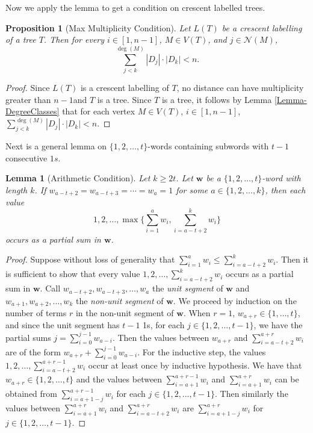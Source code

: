\documentclass[12]{article}
\newtheorem{lem}{Lemma} %
\newtheorem{prop}[thm]{Proposition}
\theoremstyle{definition}
\begin{document}
	Now we apply the lemma to get a condition on crescent labelled trees.
	
	\begin{prop}[Max Multiplicity Condition]
		Let $L(T)$ be a crescent labelling of a tree $T$.  Then for every $i \in [1,n-1]$, $M \in V(T)$, and $j \in \mathcal{N}(M)$, 
		$$\sum_{j < k}^{\deg(M)} |D_j|\cdot |D_k| < n.$$
	\end{prop}
	
	\begin{proof}
		Since $L(T)$ is a crescent labelling of $T$, no distance can have multiplicity greater than $n-1$and $T$ is a tree.  Since $T$ is a tree, it follows by Lemma \ref{Lemma-DegreeClasses} that for each vertex $M \in V(T)$, $i \in [1,n-1]$, $\sum_{j < k}^{\deg(M)} |D_j|\cdot |D_k| < n$. \qedhere
	\end{proof}
	
	Next is a general lemma on $\{1,2,\ldots,t\}$-words containing subwords with $t-1$ consecutive $1s$.
	
	\begin{lem}[Arithmetic Condition]\label{Lemma-ArithmeticCondition}
		Let $k \geq 2t$.  Let $\mathbf{w}$ be a $\{1,2,\ldots, t\}$-word with length $k$.  If $w_{a-t+2} = w_{a-t+3} = \cdots = w_{a} = 1$ for some $a \in \{1,2, \ldots, k\}$, then each value 
		$$1,2, \ldots, \max\biggr\{\sum_{i = 1}^{a}w_i, \sum_{i=a-t+2}^{k}w_i\biggr\}$$ 
		occurs as a partial sum in $\mathbf{w}$.
	\end{lem}
	
	\begin{proof}
		Suppose without loss of generality that $\sum_{i = 1}^{a}w_i \leq \sum_{i=a-t+2}^{k}w_i$.  Then it is sufficient to show that every value $1,2,\ldots, \sum_{i=a-t+2}^{k}w_i$ occurs as a partial sum in $\mathbf{w}$.  Call $w_{a-t+2},w_{a-t+3}, \ldots, w_a$ the \emph{unit segment} of $\mathbf{w}$ and $w_{a+1},w_{a+2},\ldots,w_k$ the \emph{non-unit segment} of $\mathbf{w}$.  We proceed by induction on the number of terms $r$ in the non-unit segment of $\mathbf{w}$.  When $r = 1$, $w_{a+r} \in \{1,\ldots,t\}$, and since the unit segment has $t-1$ 1s, for each $j \in \{1,2,\ldots,t-1\}$, we have the partial sums $j = \sum_{i=0}^{j-1}w_{a-i}$.  Then the values between $w_{a+r}$ and $\sum_{i=a-t+2}^{a+r}w_i$ are of the form $w_{a+r}+ \sum_{i=0}^{j-1}w_{a-i}$.  For the inductive step, the values $1,2,\ldots,\sum_{i=a-t+2}^{a+r-1}w_i$ occur at least once by inductive hypothesis.  We have that $w_{a+r} \in \{1,2,\ldots,t\}$ and the values between $\sum_{i=a+1}^{a+r-1}w_i$ and $\sum_{i=a+1}^{a+r}w_i$ can be obtained from $\sum_{i=a+1-j}^{a+r-1}w_i$ for each $j \in \{1,2,\ldots,t-1\}$.  Then similarly the values between $\sum_{i=a+1}^{a+r}w_i$ and $\sum_{i=a-t+2}^{a+r}w_i$ are $\sum_{i=a+1-j}^{a+r}w_i$ for $j \in \{1,2,\ldots,t-1\}$. \qedhere
	\end{proof}
	
\end{document}

